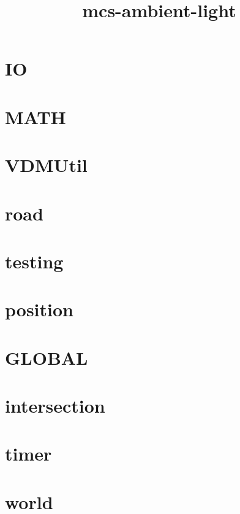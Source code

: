 \documentclass{article}
\begin{document}
\title{mcs-ambient-light}
\author{}
\maketitle
\tableofcontents

\section{IO}


\section{MATH}


\section{VDMUtil}


\section{road}


\section{testing}


\section{position}


\section{GLOBAL}


\section{intersection}


\section{timer}


\section{world}

\end{document}
